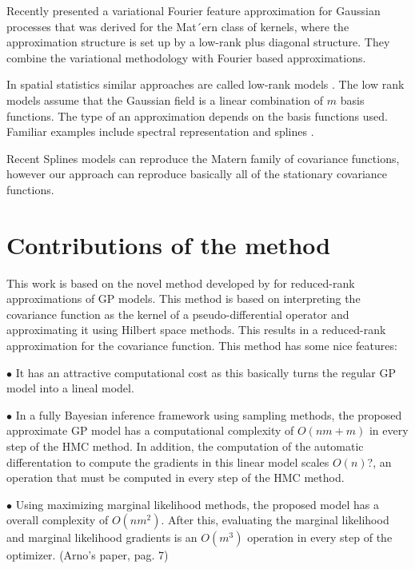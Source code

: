 \documentclass[]{interact}
\theoremstyle{plain}%
\theoremstyle{definition}
\theoremstyle{remark}
\begin{document}
Recently \citep{hensman2017variational} presented a variational Fourier feature approximation for Gaussian processes that was derived for the Mat´ern class of kernels, where the approximation structure is set up by a low-rank plus diagonal structure. They combine the variational methodology with Fourier based approximations.

In spatial statistics similar approaches are called low-rank models \citep{diggle2007springer}. The low rank models assume that the Gaussian field is a linear combination of $m$ basis functions. The type of an approximation depends on the basis functions used. Familiar examples include spectral representation \citep{diggle2007springer,paciorek2007computational,paciorek2007bayesian} and splines \citep{wood2003thin}. 

Recent Splines models can reproduce the Matern family of covariance functions, however our approach can reproduce basically all of the stationary covariance functions.


\section{Contributions of the method}

This work is based on the novel method developed by \cite{solin2018hilbert} for reduced-rank approximations of GP models. This method is based on interpreting the covariance function as the kernel of a pseudo-differential operator and approximating it using Hilbert space methods. This results in a reduced-rank approximation for the covariance function. This method has some nice features:

\vspace{2mm}
$\bullet$ It has an attractive computational cost as this basically turns the regular GP model into a lineal model.

\vspace{2mm}
$\bullet$ In a fully Bayesian inference framework using sampling methods, the proposed approximate GP model has a computational complexity of $O(nm+m)$ in every step of the HMC method. In addition, the computation of the automatic differentation to compute the gradients in this linear model scales $O(n)$?, an operation that must be computed in every step of the HMC method.

\vspace{2mm}
$\bullet$ Using maximizing marginal likelihood methods, the proposed model has a overall complexity of $O(nm^2)$. After this, evaluating the marginal likelihood and marginal likelihood gradients is an $O(m^3)$ operation in every step of the optimizer. (Arno's paper, pag. 7)
\end{document}
